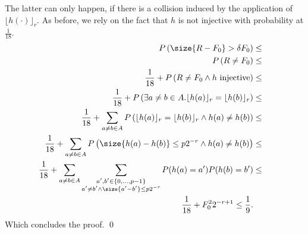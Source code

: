 \documentclass[11pt,a4paper]{article}
\begin{document}
The latter can only happen, if there is a collision induced by the application of $\lfloor h(\cdot)\rfloor_r$. As before, we rely on the fact that $h$ is not injective with probability at $\frac{1}{18}$.
\begin{eqnarray*}
    P\left( \size{R - F_0} > \delta F_0\right) & \leq & \\
    P\left( R \neq F_0 \right) & \leq & \\
    \frac{1}{18} + P\left( R \neq F_0 \wedge h \textrm{ injective} \right) & \leq & \\
    \frac{1}{18} + P\left( \exists a \neq b \in A. \lfloor h(a) \rfloor_r = \lfloor h(b) \rfloor_r  \right) & \leq & \\
    \frac{1}{18} + \sum_{a \neq b \in A} P\left(\lfloor h(a) \rfloor_r = \lfloor h(b) \rfloor_r \wedge h(a) \neq h(b) \right) & \leq & \\
    \frac{1}{18} + \sum_{a \neq b \in A} P\left(\size{h(a) - h(b)} \leq p 2^{-r} \wedge h(a) \neq h(b) \right) & \leq & \\
    \frac{1}{18} + \sum_{a \neq b \in A} \sum_{\substack{a', b' \in \{0,\ldots, p-1\} \\  a' \neq b' \wedge \size{a'-b'} \leq p 2^{-r}}} P(h(a) = a') P(h(b)= b') & \leq & \\
    \frac{1}{18} + F_0^2 2^{-r+1} \leq \frac{1}{9} \textrm{.}
\end{eqnarray*}
Which concludes the proof. \qed

%
%
\end{document}
